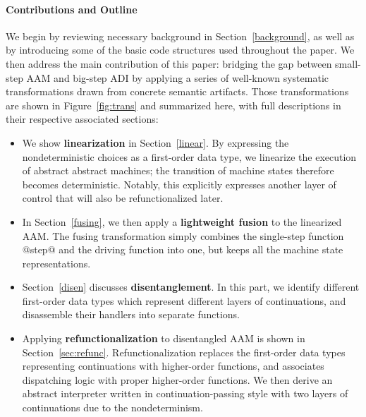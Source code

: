 \documentclass[acmsmall, review]{acmart}\settopmatter{}
\begin{document}
\paragraph{Contributions and Outline}

We begin by reviewing necessary background in Section~\ref{background},
as well as by introducing some of the basic code structures used throughout the paper.
We then address the main contribution of this paper: bridging the gap between
small-step AAM and big-step ADI by applying a series of well-known systematic transformations
drawn from concrete semantic artifacts.
Those transformations are shown in Figure~\ref{fig:trans} and summarized here, with full
descriptions in their respective associated sections:

\begin{itemize}
  \item We show \textbf{linearization} in Section~\ref{linear}. By expressing the
    nondeterministic choices as a first-order data type, we linearize the execution
    of abstract abstract machines; the transition of machine states therefore becomes
    deterministic. Notably, this explicitly expresses another layer of control that
    will also be refunctionalized later.

  \item In Section~\ref{fusing}, we then apply a \textbf{lightweight fusion} 
    \cite{DANVY2008100, Ohori:2007:LFF:1190216.1190241} to the linearized AAM. 
    The fusing transformation simply combines the single-step function @step@ and the 
    driving function into one, but keeps all the machine state representations.

  \item Section~\ref{disen} discusses \textbf{disentanglement}. In this part, we identify 
    different first-order data types which represent different layers of continuations, and
    disassemble their handlers into separate functions.

  \item Applying \textbf{refunctionalization} \cite{DANVY2009534, Danvy:2006:RW:2171265.2171268} 
    to disentangled AAM is shown in Section~\ref{sec:refunc}. 
    Refunctionalization replaces the first-order data types representing continuations with
    higher-order functions, and associates dispatching logic with proper higher-order functions. 
    We then derive an abstract interpreter written in continuation-passing style with two
    layers of continuations due to the nondeterminism.


\end{itemize}
\end{document}
